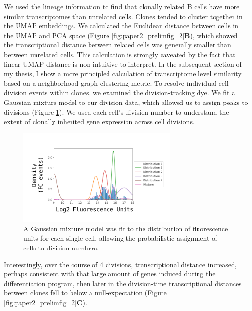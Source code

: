 We used the lineage information to find that clonally related B cells have more similar transcriptomes than unrelated cells. Clones tended to cluster together in the UMAP embeddings. We calculated the Euclidean distance between cells in the UMAP and PCA space (Figure \ref{fig:paper2_prelimfig_2}\textbf{B}), which showed the transcriptional distance between related cells was generally smaller than between unrelated cells. This calculation is strongly caveated by the fact that linear UMAP distance is non-intuitive to interpret. In the subsequent section of my thesis, I show a more principled calculation of transcriptome level similarity based on a neighborhood graph clustering metric. To resolve individual cell division events within clones, we examined the division-tracking dye\cite{hasbold1998cell}. We fit a Gaussian mixture model to our division data, which allowed us to assign peaks to divisions (Figure \ref{fig:paper2_CTV_gaussian}). We used each cell’s division number to understand the extent of clonally inherited gene expression across cell divisions. 
\begin{figure}[htb!]
\centering
\includegraphics[width=8cm, keepaspectratio]{figs/prelim_InVitro/gaussian_CTV_model.png}
\caption[Example of Cell Division Tracking Dye data fit with a Gaussian Mixture Model]{A Gaussian mixture model was fit to the distribution of fluorescence units for each single cell, allowing the probabilistic assignment of cells to division numbers.}
\label{fig:paper2_CTV_gaussian}
\end{figure}

Interestingly, over the course of 4 divisions, transcriptional distance increased, perhaps consistent with that large amount of genes induced during the differentiation program, then later in the division-time transcriptional distances between clones fell to below a null-expectation  (Figure \ref{fig:paper2_prelimfig_2}\textbf{C}).  


